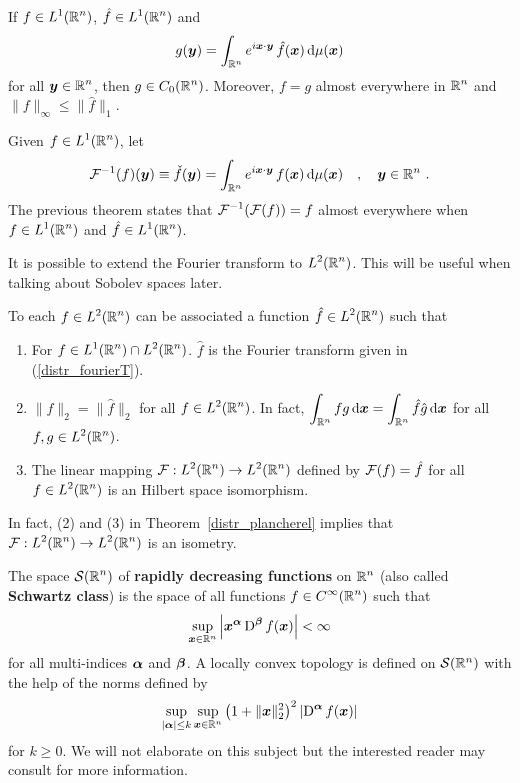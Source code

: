 \begin{prop} \label{distr_inv_four_transf}
If $\displaystyle f \in L^1(\mathbb{R}^n)$, $\displaystyle \hat{f} \in L^1(\mathbb{R}^n)$ and
\[
g({\bm{y}}) = \int_{\mathbb{R}^n} e^{i {\bm{x}}\cdot{\bm{y}}} \,
\hat{f}({\bm{x}}) \,\mathrm{d}{\mu({\bm{x}})}
\]
for all $\displaystyle {\bm{y}} \in \mathbb{R}^n$, then
$\displaystyle g \in C_0(\mathbb{R}^n)$.  Moreover, $f = g$ almost everywhere
in $\displaystyle \mathbb{R}^n$ and $\|f\|_\infty \leq \|\hat{f}\|_1$.
\end{prop}

Given $\displaystyle f\in L^1(\mathbb{R}^n)$, let
\[
\mathcal{F}^{-1}(f)({\bm{y}}) \equiv \check{f}({\bm{y}}) = 
\int_{\mathbb{R}^n} e^{i {\bm{x}}\cdot{\bm{y}}} \, f({\bm{x}}) \,\mathrm{d}{\mu({\bm{x}})}
\quad , \quad {\bm{y}} \in \mathbb{R}^n \ .
\]
The previous theorem states that $\displaystyle \mathcal{F}^{-1}(\mathcal{F}(f)) = f$
almost everywhere when $\displaystyle f \in L^1(\mathbb{R}^n)$
and $\displaystyle \hat{f} \in L^1(\mathbb{R}^n)$.

It is possible to extend the Fourier transform to $\displaystyle L^2(\mathbb{R}^n)$.
This will be useful when talking about Sobolev spaces later.

\begin{theorem}[Plancherel] \label{distr_plancherel}
To each $\displaystyle f\in L^2(\mathbb{R}^n)$ can be associated a function
$\displaystyle \hat{f} \in L^2(\mathbb{R}^n)$ such that   
\begin{enumerate}
\item For $\displaystyle f \in L^1(\mathbb{R}^n) \cap L^2(\mathbb{R}^n)$. $\hat{f}$ is the
Fourier transform given in (\ref{distr_fourierT}).
\item $\| f \|_2 = \|\hat{f}\|_2$ for all $\displaystyle f \in L^2(\mathbb{R}^n)$.
In fact, $\displaystyle \int_{\mathbb{R}^n} f g \,\mathrm{d}{{\bm{x}}} =
\int_{\mathbb{R}^n} \hat{f} \hat{g} \,\mathrm{d}{{\bm{x}}}$ for all
$\displaystyle f,g \in L^2(\mathbb{R}^n)$.
\item The linear mapping $\displaystyle \mathcal{F}: L^2(\mathbb{R}^n) \rightarrow L^2(\mathbb{R}^n)$
defined by $\mathcal{F}(f) = \hat{f}$ for all $\displaystyle f \in L^2(\mathbb{R}^n)$
is an Hilbert space isomorphism.
\end{enumerate}
\end{theorem}

In fact, (2) and (3) in Theorem~\ref{distr_plancherel} implies that 
$\displaystyle \mathcal{F}: L^2(\mathbb{R}^n) \rightarrow L^2(\mathbb{R}^n)$ is an isometry.

The space $\displaystyle \mathcal{S}(\mathbb{R}^n)$ of
{\bfseries rapidly decreasing functions} on $\displaystyle \mathbb{R}^n$ (also called 
{\bfseries Schwartz class}) is the space of all
functions $\displaystyle f \in C^\infty(\mathbb{R}^n)$ such that
\[
\sup_{{\bm{x}} \in \mathbb{R}^n} \left| {\bm{x}}^{{\bm{\alpha}}}
\operatorname{D}^{{\bm{\beta}}} f({\bm{x}}) \right| < \infty
\]
for all multi-indices ${\bm{\alpha}}$ and ${\bm{\beta}}$.  A locally
convex topology is defined on $\mathcal{S}(\mathbb{R}^n)$ with the help of the norms
defined by
\[
\sup_{|{\bm{\alpha}}|\leq k} \sup_{{\bm{x}} \in \mathbb{R}^n}
\left( 1 + \|{\bm{x}}\|_2^2\right)^2
\left| \operatorname{D}^{{\bm{\alpha}}} f({\bm{x}}) \right|
\]
for $k \geq 0$.  We will not elaborate on this subject but the
interested reader may consult \cite{RuFA,ReeSim} for more information.

